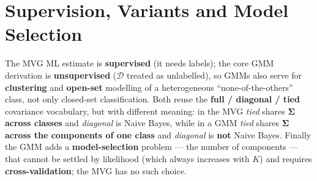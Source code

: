 \section*{Supervision, Variants and Model Selection}

The MVG ML estimate is \textbf{supervised} (it needs labels); the core GMM derivation is \textbf{unsupervised} ($\mathcal{D}$ treated as unlabelled), so GMMs also serve for \textbf{clustering} and \textbf{open-set} modelling of a heterogeneous ``none-of-the-others'' class, not only closed-set classification. Both reuse the \textbf{full / diagonal / tied} covariance vocabulary, but with different meaning: in the MVG \emph{tied} shares $\boldsymbol{\Sigma}$ \textbf{across classes} and \emph{diagonal} is Naive Bayes, while in a GMM \emph{tied} shares $\boldsymbol{\Sigma}$ \textbf{across the components of one class} and \emph{diagonal} is \textbf{not} Naive Bayes. Finally the GMM adds a \textbf{model-selection} problem — the number of components — that cannot be settled by likelihood (which always increases with $K$) and requires \textbf{cross-validation}; the MVG has no such choice.

\begin{center}
\renewcommand{\arraystretch}{1.2}
%
\end{center}
